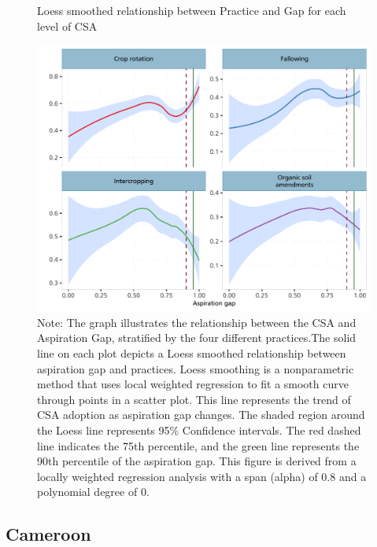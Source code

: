 \documentclass[
]{article}
\begin{document}
\begin{figure}[htbp]
\centering
\caption{Loess smoothed relationship between Practice and Gap for each level of CSA}
\includegraphics[width=\textwidth]{figures/fig_NP.pdf}

\caption*{
Note: The graph illustrates the relationship between the CSA and Aspiration Gap, stratified by the four different practices.The solid line on each plot depicts a Loess smoothed relationship between aspiration gap and 
practices. Loess smoothing is a nonparametric method that uses local weighted regression to fit a smooth curve through points in a scatter plot. This line represents the trend of CSA adoption as aspiration gap changes. The shaded region around the Loess line represents 95\% Confidence intervals. The red dashed line indicates the 75th percentile, and the green line represents the 90th percentile of the aspiration gap. This figure is derived from a locally weighted regression analysis with a span (alpha) of 0.8 and a polynomial degree of 0.
}
\end{figure}

\newpage

\hypertarget{cameroon}{%
\subsection{Cameroon}\label{cameroon}}
\end{document}
